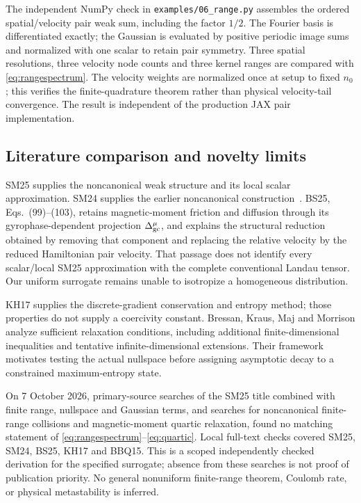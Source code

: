 \documentclass[11pt,letterpaper]{article}
\begin{document}
The independent NumPy check in \texttt{examples/06\_range.py} assembles the
ordered spatial/velocity pair weak sum, including the factor $1/2$. The
Fourier basis is differentiated exactly; the Gaussian is evaluated by positive
periodic image sums and normalized with one scalar to retain pair symmetry.
Three spatial resolutions, three velocity node counts and three kernel ranges
are compared with \eqref{eq:rangespectrum}. The velocity weights are normalized
once at setup to fixed $n_0$; this verifies the finite-quadrature theorem rather
than physical velocity-tail convergence. The result is independent of the
production JAX pair implementation.

\subsection*{Literature comparison and novelty limits}

SM25 supplies the noncanonical weak structure and its local scalar approximation.
SM24 supplies the earlier noncanonical construction~\cite{SM24}. BS25, Eqs.~(99)--(103),
retains magnetic-moment friction and diffusion through its gyrophase-dependent
projection $\Delta^\mu_{\rm gc}$, and explains the structural reduction obtained
by removing that component and replacing the relative velocity by the reduced
Hamiltonian pair velocity. That passage does not identify every scalar/local
SM25 approximation with the complete conventional Landau tensor. Our uniform
surrogate remains unable to isotropize a homogeneous distribution.

KH17 supplies the discrete-gradient conservation and entropy method; those
properties do not supply a coercivity constant. Bressan, Kraus, Maj and Morrison
\cite{BKMM25} analyze sufficient relaxation conditions, including additional
finite-dimensional inequalities and tentative infinite-dimensional extensions.
Their framework motivates testing the actual nullspace before assigning
asymptotic decay to a constrained maximum-entropy state.

On 7 October 2026, primary-source searches of the SM25 title combined with
finite range, nullspace and Gaussian terms, and searches for noncanonical
finite-range collisions and magnetic-moment quartic relaxation, found no
matching statement of \eqref{eq:rangespectrum}--\eqref{eq:quartic}. Local full-text
checks covered SM25, SM24, BS25, KH17 and BBQ15. This is a scoped independently
checked derivation for the specified surrogate; absence from these searches is
not proof of publication priority. No general nonuniform finite-range theorem,
Coulomb rate, or physical metastability is inferred.
\end{document}
